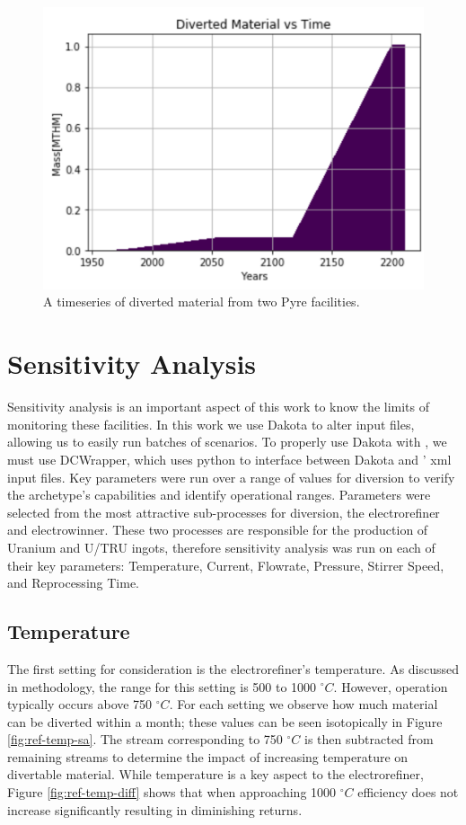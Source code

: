 \begin{figure}
	\centering
	\includegraphics[width=0.9\linewidth]{images/divertmat}
	\caption{A timeseries of diverted material from two Pyre facilities.}
	\label{fig:divertmat}
\end{figure}

\section{Sensitivity Analysis}

Sensitivity analysis is an important aspect of this work to know the limits of monitoring these facilities. In this work we use Dakota to alter \Cyclus input files, allowing us to easily
run batches of scenarios. To properly use Dakota with \Cyclus, we must use DCWrapper, which uses python to interface between Dakota and \Cyclus' xml input files. 
Key parameters were run over a range of values for diversion to verify the archetype's capabilities and identify operational ranges. Parameters were selected from the most attractive
sub-processes for diversion, the electrorefiner and electrowinner. These two processes are responsible for the production of Uranium and U/TRU ingots, therefore sensitivity analysis was run
on each of their key parameters: Temperature, Current, Flowrate, Pressure, Stirrer Speed, and Reprocessing Time.

\subsection{Temperature}

The first setting for consideration is the electrorefiner's temperature. As discussed in methodology, the range for this setting is 500 to 1000 $^\circ C$. However, operation
typically occurs above 750 $^\circ C$. For each setting we observe how much material can be diverted within a month; these values can be seen isotopically in Figure \ref{fig:ref-temp-sa}.
The stream corresponding to 750 $^\circ C$ is then subtracted from remaining streams to determine the impact of increasing temperature on divertable material.
While temperature is a key aspect to the electrorefiner, Figure \ref{fig:ref-temp-diff} shows that when approaching 1000 $^\circ C$ efficiency does not increase significantly resulting
in diminishing returns.

